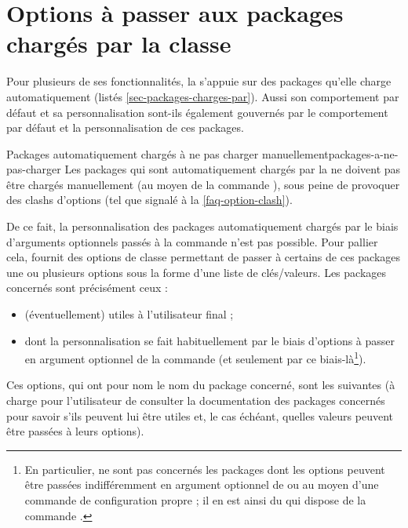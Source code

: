 \section{Options à passer aux packages chargés par la classe}
\label{sec-options-passer-aux}

Pour plusieurs de ses fonctionnalités, la \yatcl s'appuie sur des packages
qu'elle charge automatiquement (listés
\vref{sec-packages-charges-par}). Aussi son comportement par défaut et sa
personnalisation sont-ils également gouvernés par le comportement par défaut et
la personnalisation de ces packages.

\begin{dbwarning}{Packages automatiquement chargés à ne pas charger
    manuellement}{packages-a-ne-pas-charger}
  Les packages qui sont automatiquement chargés par la \yatcl{} ne doivent pas
  être chargés manuellement (au moyen de la commande
  ), sous peine de provoquer des clashs d'options (tel
  que signalé à la \vref{faq-option-clash}).
\end{dbwarning}

De ce fait, la personnalisation des packages automatiquement chargés par le
biais d'arguments optionnels passés à la commande 
n'est pas possible. Pour pallier cela, \yat{} fournit des options de classe
permettant de passer à certains de ces packages une ou plusieurs options sous
la forme d'une liste de clés/valeurs. Les packages concernés sont précisément
ceux :
\begin{itemize}
\item (éventuellement) utiles à l'utilisateur final ;
\item dont la personnalisation se fait habituellement par le biais d'options
  à passer en argument optionnel de la commande  (et
  seulement par ce biais-là\footnote{En particulier, ne sont pas concernés les
    packages dont les options peuvent être passées indifféremment en argument
    optionnel de \protect{} ou au moyen d'une commande
    de configuration propre ; il en est ainsi du  qui dispose
    de la commande \protect{}.}).
\end{itemize}
Ces options, qui ont pour nom le nom du package concerné, sont les suivantes (à
charge pour l'utilisateur de consulter la documentation des packages concernés
pour savoir s'ils peuvent lui être utiles et, le cas échéant, quelles valeurs
peuvent être passées à leurs options).

